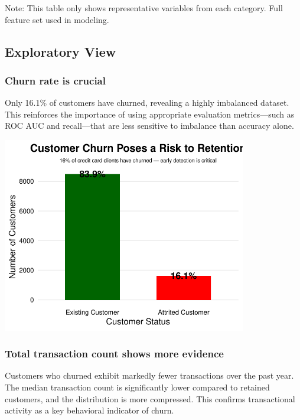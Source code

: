 \documentclass[
  letterpaper,
  DIV=11,
  numbers=noendperiod]{scrartcl}
\begin{document}
Note: This table only shows representative variables from each category.
Full feature set used in modeling.

\newpage

\subsection{Exploratory View}\label{exploratory-view}

\subsubsection{Churn rate is crucial}\label{churn-rate-is-crucial}

Only 16.1\% of customers have churned, revealing a highly imbalanced
dataset. This reinforces the importance of using appropriate evaluation
metrics---such as ROC AUC and recall---that are less sensitive to
imbalance than accuracy alone.

\begin{center}
\includegraphics[width=0.8\textwidth,height=\textheight]{v4_files/figure-pdf/unnamed-chunk-14-1.pdf}
\end{center}

\subsubsection{Total transaction count shows more
evidence}\label{total-transaction-count-shows-more-evidence}

Customers who churned exhibit markedly fewer transactions over the past
year. The median transaction count is significantly lower compared to
retained customers, and the distribution is more compressed. This
confirms transactional activity as a key behavioral indicator of churn.
\end{document}

